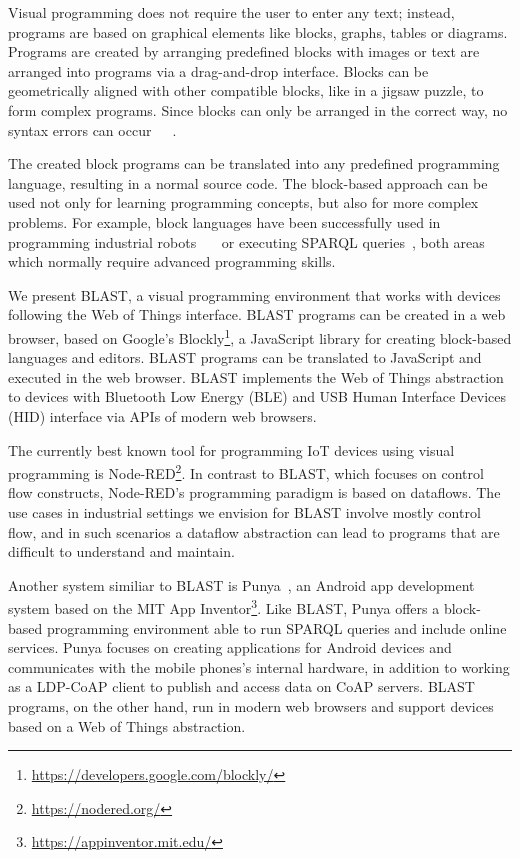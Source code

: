 \documentclass[runningheads]{llncs}
\begin{document}
Visual programming does not require the user to enter any text; instead, programs are based on graphical elements like blocks, graphs, tables or diagrams.
Programs are created by arranging predefined blocks with images or text are arranged into programs via a drag-and-drop interface.
Blocks can be geometrically aligned with other compatible blocks, like in a jigsaw puzzle, to form complex programs.
Since blocks can only be arranged in the correct way, no syntax errors can occur~\cite{10.11453341221}~\cite{maloney2010scratch}~\cite{10.1145/1089733.1089734}.

The created block programs can be translated into any predefined programming language, resulting in a normal source code. 
The block-based approach can be used not only for learning programming concepts, but also for more complex problems.
For example, block languages have been successfully used in programming industrial robots~\cite{8120406}~\cite{ghazal2016framework}~\cite{tomlein2017visual} or executing SPARQL queries~\cite{7369012}, both areas which normally require advanced programming skills.

We present BLAST, a visual programming environment that works with devices following the Web of Things interface.
BLAST programs can be created in a web browser, based on Google's Blockly\footnote{\url{https://developers.google.com/blockly/}}, a JavaScript library for creating block-based languages and editors.
BLAST programs can be translated to JavaScript and executed in the web browser.
BLAST implements the Web of Things abstraction to devices with Bluetooth Low Energy (BLE) and USB Human Interface Devices (HID) interface via APIs of modern web browsers.

The currently best known tool for programming IoT devices using visual programming is Node-RED\footnote{\url{https://nodered.org/}}.
In contrast to BLAST, which focuses on control flow constructs, Node-RED's programming paradigm is based on dataflows.
The use cases in industrial settings we envision for BLAST involve mostly control flow, and in such scenarios a dataflow abstraction can lead to programs that are difficult to understand and maintain.

Another system similiar to BLAST is Punya~\cite{patton2021punya}, an Android app development system based on the MIT App Inventor\footnote{\url{https://appinventor.mit.edu/}}.
Like BLAST, Punya offers a block-based programming environment able to run SPARQL queries and include online services.
Punya focuses on creating applications for Android devices and communicates with the mobile phones's internal hardware, in addition to working as a LDP-CoAP client to publish and access data on CoAP servers.
BLAST programs, on the other hand, run in modern web browsers and support devices based on a Web of Things abstraction.
\end{document}
